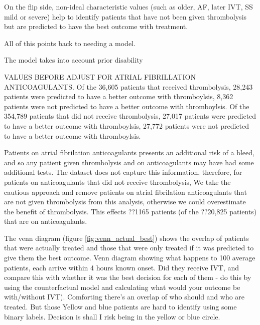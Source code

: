 On the flip side, non-ideal characteristic values (such as older, AF, later IVT, SS mild or severe) help to identify patients that have not been given thrombolysis but are predicted to have the best outcome with treatment.

All of this points back to needing a model.

The model takes into account prior disability 


VALUES BEFORE ADJUST FOR ATRIAL FIBRILLATION ANTICOAGULANTS.
Of the 36,605 patients that received thrombolysis, 28,243 patients were predicted to have a better outcome with thromboylsis, 8,362 patients were not predicted to have a better outcome with thromboylsis.
Of the 354,789 patients that did not receive thrombolysis, 27,017 patients were predicted to have a better outcome with thromboylsis, 27,772 patients were not predicted to have a better outcome with thromboylsis.




Patients on atrial fibrilation anticoagulants presents an additional risk of a bleed, and so any patient given thrombolysis and on anticoagulants may have had some additional tests. The dataset does not capture this information, therefore, for patients on anticoagulants that did not receive thrombolysis, We take the cautious approach and remove patients on atrial fibrilation anticoagulants that are not given thrombolysis from this analysis, otherwise we could overestimate the benefit of thrombolysis. This effects ??1165 patients (of the ??20,825 patients) that are on anticoagulants.





\iffalse
The venn diagram (figure \ref{fig:venn_actual_best}) shows the overlap of patients that were actually treated and those that were only treated if it was predicted to give them the best outcome.
Venn diagram showing what happens to 100 average patients, each arrive within 4 hours known onset. Did they receive IVT, and compare this with whether it was the best decision for each of them - do this by using the counterfactual model and calculating what would your outcome be with/without IVT). Comforting there's an overlap of who should and who are treated. But those Yellow and blue patients are hard to identify using some binary labels. Decision is shall I risk being in the yellow or blue circle.


